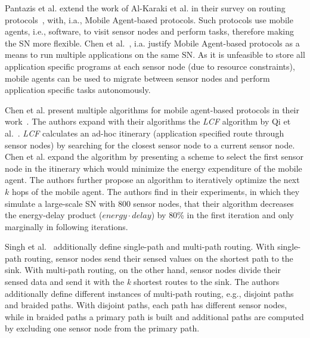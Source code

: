 Pantazis et al. extend the work of Al-Karaki et al. in their survey on routing
protocols~\cite{pantazis2013energy}, with, i.a., Mobile Agent-based protocols.
Such protocols use mobile agents, i.e., software, to visit sensor nodes and
perform tasks, therefore making the \ac{SN} more flexible. Chen et
al.~\cite{chen2007applications}, i.a. justify Mobile Agent-based protocols as a
means to run multiple applications on the same \ac{SN}. As it is unfeasible to
store all application specific programs at each sensor node (due to resource
constraints), mobile agents can be used to migrate between sensor nodes and
perform application specific tasks autonomously.

Chen et al. present multiple algorithms for mobile agent-based protocols in
their work~\cite{chen2011itinerary}. The authors expand with their algorithms
the \textit{LCF} algorithm by Qi et al.~\cite{qi2001optimal}. \textit{LCF}
calculates an ad-hoc itinerary (application specified route through sensor
nodes) by searching for the closest sensor node to a current sensor node. Chen
et al. expand the algorithm by presenting a scheme to select the first sensor
node in the itinerary which would minimize the energy expenditure of the mobile
agent. The authors further propose an algorithm to iteratively optimize the
next $ k $ hops of the mobile agent. The authors find in their experiments, in
which they simulate a large-scale \ac{SN} with 800 sensor nodes, that their
algorithm decreases the energy-delay product ($ energy \cdot delay $) by 80\%
in the first iteration and only marginally in following iterations.

Singh et al.~\cite{singh2010routing} additionally define single-path and
multi-path routing. With single-path routing, sensor nodes send their sensed
values on the shortest path to the sink. With multi-path routing, on the other
hand, sensor nodes divide their sensed data and send it with the \textit{k}
shortest routes to the sink. The authors additionally define different
instances of multi-path routing, e.g., disjoint paths and braided paths. With
disjoint paths, each path has different sensor nodes, while in braided paths a
primary path is built and additional paths are computed by excluding one sensor
node from the primary path.

